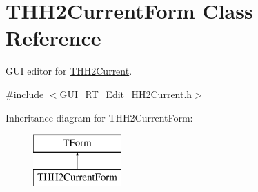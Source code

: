 \hypertarget{class_t_h_h2_current_form}{\section{T\+H\+H2\+Current\+Form Class Reference}
\label{class_t_h_h2_current_form}
}


G\+U\+I editor for \hyperlink{class_t_h_h2_current}{T\+H\+H2\+Current}.  




{\ttfamily \#include $<$G\+U\+I\+\_\+\+R\+T\+\_\+\+Edit\+\_\+\+H\+H2\+Current.\+h$>$}

Inheritance diagram for T\+H\+H2\+Current\+Form\+:\begin{figure}[H]
\begin{center}
\leavevmode
\includegraphics[height=2.000000cm]{class_t_h_h2_current_form}
\end{center}
\end{figure}
